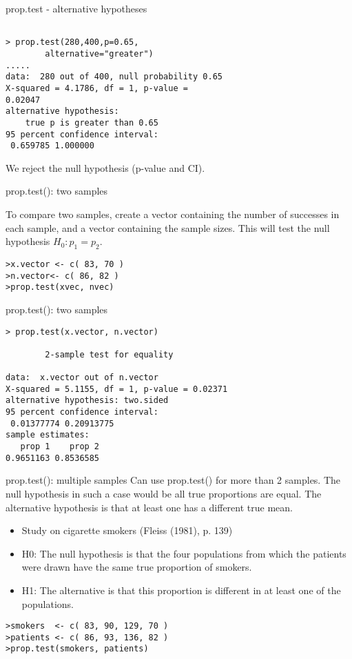 \documentclass[pdf,default,slideColor,colorBG]{prosper}
\begin{document}
\begin{slide}{prop.test - alternative hypotheses}
\begin{verbatim}

> prop.test(280,400,p=0.65,
        alternative="greater")
.....
data:  280 out of 400, null probability 0.65
X-squared = 4.1786, df = 1, p-value =
0.02047
alternative hypothesis: 
    true p is greater than 0.65
95 percent confidence interval:
 0.659785 1.000000
\end{verbatim}
We reject the null hypothesis (p-value and CI).

\end{slide}
\begin{slide}{prop.test(): two samples}

To compare two samples, create a vector containing the number of successes in each sample, and a vector containing the sample sizes. 
This will test the null hypothesis $H_0:p_{1}=p_{2}$.
\begin{verbatim}
>x.vector <- c( 83, 70 )
>n.vector<- c( 86, 82 )
>prop.test(xvec, nvec)
\end{verbatim}
\end{slide}
\begin{slide}{prop.test(): two samples}
\begin{verbatim}
> prop.test(x.vector, n.vector)

        2-sample test for equality 

data:  x.vector out of n.vector
X-squared = 5.1155, df = 1, p-value = 0.02371
alternative hypothesis: two.sided
95 percent confidence interval:
 0.01377774 0.20913775
sample estimates:
   prop 1    prop 2
0.9651163 0.8536585 
\end{verbatim}
\end{slide}

\begin{slide}{prop.test(): multiple samples}
Can use prop.test() for more than 2 samples. The null hypothesis in such a case would be all true proportions are equal. The alternative hypothesis is that at least one has a different true mean.
\begin{itemize}
\item Study on cigarette smokers (Fleiss (1981), p. 139)
\item H0: The null hypothesis is that the four populations from which
the patients were drawn have the same true proportion of smokers.
\item H1: The alternative is that this proportion is different in at
least one of the populations.
\end{itemize}
\begin{verbatim}
>smokers  <- c( 83, 90, 129, 70 )
>patients <- c( 86, 93, 136, 82 )
>prop.test(smokers, patients)
\end{verbatim}
\end{slide}
\end{document}
